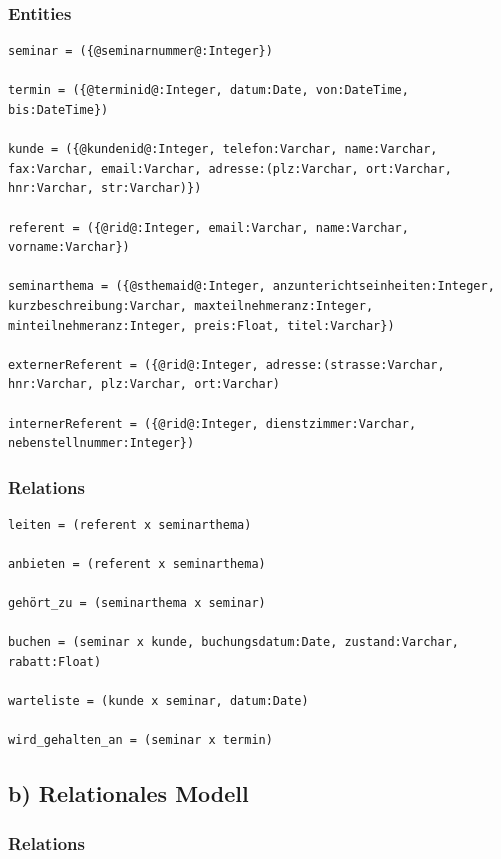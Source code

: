 \documentclass[10pt,a4paper]{article}
\begin{document}
\newpage

\subsubsection{Entities}
\begin{lstlisting}[]
seminar = ({@seminarnummer@:Integer})

termin = ({@terminid@:Integer, datum:Date, von:DateTime, bis:DateTime})

kunde = ({@kundenid@:Integer, telefon:Varchar, name:Varchar, fax:Varchar, email:Varchar, adresse:(plz:Varchar, ort:Varchar, hnr:Varchar, str:Varchar)})  

referent = ({@rid@:Integer, email:Varchar, name:Varchar, vorname:Varchar})

seminarthema = ({@sthemaid@:Integer, anzunterichtseinheiten:Integer, kurzbeschreibung:Varchar, maxteilnehmeranz:Integer, minteilnehmeranz:Integer, preis:Float, titel:Varchar})

externerReferent = ({@rid@:Integer, adresse:(strasse:Varchar, hnr:Varchar, plz:Varchar, ort:Varchar)

internerReferent = ({@rid@:Integer, dienstzimmer:Varchar, nebenstellnummer:Integer})
\end{lstlisting}

\subsubsection{Relations}
\begin{lstlisting}[]
leiten = (referent x seminarthema)

anbieten = (referent x seminarthema)

gehört_zu = (seminarthema x seminar)

buchen = (seminar x kunde, buchungsdatum:Date, zustand:Varchar, rabatt:Float)

warteliste = (kunde x seminar, datum:Date)

wird_gehalten_an = (seminar x termin)
\end{lstlisting}

\subsection{b) Relationales Modell}
\subsubsection{Relations}
\end{document}
